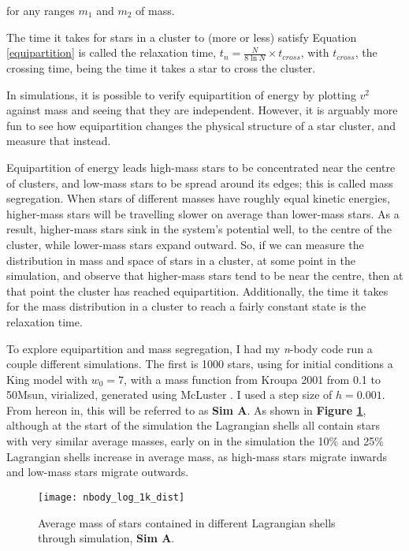 \documentclass{article}
\begin{document}
for any ranges $m_1$ and $m_2$ of mass. 

The time it takes for stars in a cluster to (more or less) satisfy Equation \ref{equipartition} is called the relaxation time, $t_n=\frac{N}{8\ln N} \times t_{cross}$, with $t_{cross}$, the crossing time, being the time it takes a star to cross the cluster.

In simulations, it is possible to verify equipartition of energy by plotting $v^2$ against mass and seeing that they are independent. However, it is arguably more fun to see how equipartition changes the physical structure of a star cluster, and measure that instead.

Equipartition of energy leads high-mass stars to be concentrated near the centre of clusters, and low-mass stars to be spread around its edges; this is called mass segregation. When stars of different masses have roughly equal kinetic energies, higher-mass stars will be travelling slower on average than lower-mass stars. As a result, higher-mass stars sink in the system's potential well, to the centre of the cluster, while lower-mass stars expand outward. So, if we can measure the distribution in mass and space of stars in a cluster, at some point in the simulation, and observe that higher-mass stars tend to be near the centre, then at that point the cluster has reached equipartition. Additionally, the time it takes for the mass distribution in a cluster to reach a fairly constant state is the relaxation time.

To explore equipartition and mass segregation, I had my \textit{n}-body code run a couple different simulations. The first is 1000 stars, using for initial conditions a King model with $w_0=7$, with a mass function from Kroupa 2001 \cite{kroupa2001variation} from 0.1 to 50Msun, virialized, generated using McLuster \cite{kupper2011mass}. I used a step size of $h=0.001$. From hereon in, this will be referred to as \textbf{Sim A}. As shown in \textbf{Figure \ref{nbody_log_1k_dist}}, although at the start of the simulation the Lagrangian shells all contain stars with very similar average masses, early on in the simulation the 10\% and 25\% Lagrangian shells increase in average mass, as high-mass stars migrate inwards and low-mass stars migrate outwards.

\begin{figure}
\centering
    \texttt{[image: nbody\_log\_1k\_dist]}
    \linespread{1}
    \caption{Average mass of stars contained in different Lagrangian shells through simulation, \textbf{Sim A}.}
    \label{nbody_log_1k_dist}
\end{figure}
\linespread{1}
\end{document}
